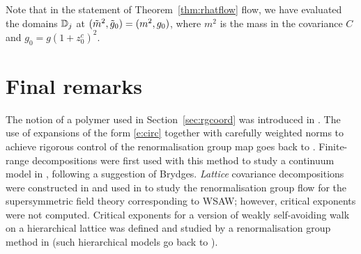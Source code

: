 Note that in the statement of Theorem~\ref{thm:rhatflow} flow, we have evaluated
the domains $\mathbb{D}_j$ at $(\tilde{m}^2, \tilde{g}_0) = (m^2, g_0)$, where $m^2$ is the
mass in the covariance $C$ and $g_0 = g (1 + z_0^c)^2$.


\section{Final remarks}

The notion of a polymer used in Section~\ref{sec:rgcoord} was introduced in
\cite{GK71}. The use of expansions of the form \eqref{e:circ} together with
carefully weighted norms to achieve rigorous control of the renormalisation
group map goes back to \cite{BY90}.
Finite-range decompositions were first used with this method to study a
continuum model in
\cite{MS00}, following a suggestion of Brydges. \emph{Lattice} covariance
decompositions were constructed in \cite{BGM04} and used in
\cite{MS08} to study the renormalisation group flow for the supersymmetric
field theory corresponding to WSAW; however, critical exponents were not
computed.
Critical exponents for a version of weakly self-avoiding walk on a hierarchical
lattice was defined and studied by a renormalisation group method in
\cite{BEI92,BI03c,BI03d} (such hierarchical models go back to \cite{Dyso69}).
